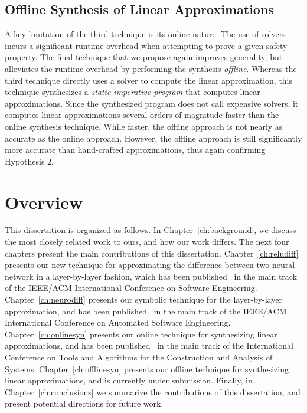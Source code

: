 \subsection{Offline Synthesis of Linear Approximations}
A key limitation of the third technique is its online nature. The use of solvers
incurs a significant runtime overhead when attempting to prove a given safety
property. The final technique that we propose again improves generality, but
alleviates the runtime overhead by performing the synthesis \textit{offline}.
Whereas the third technique directly uses a solver to compute the linear
approximation, this technique synthesizes a \textit{static imperative program}
that computes linear approximations. Since the synthesized program does not call
expensive solvers, it computes linear approximations several orders of magnitude
faster than the online synthesis technique. While faster, the offline approach is
not nearly as accurate as the online approach. However, the offline approach is
still significantly more accurate than hand-crafted approximations, thus again
confirming Hypothesis 2.

\section{Overview}
This dissertation is organized as follows. In Chapter~\ref{ch:background}, we
discuss the most closely related work to ours, and how our work differs. The next
four chapters present the main contributions of this dissertation.
Chapter~\ref{ch:reludiff} presents our new technique for approximating the
difference between two neural network in a layer-by-layer fashion, which has been
published~\cite{paulsen2020reludiff} in the main track of the IEEE/ACM
International Conference on Software Engineering. Chapter~\ref{ch:neurodiff}
presents our symbolic technique for the layer-by-layer approximation, and has been
published~\cite{paulsen2020neurodiff} in the main track of the IEEE/ACM
International Conference on Automated Software Engineering.
Chapter~\ref{ch:onlinesyn} presents our online technique for synthesizing linear
approximations, and has been published~\cite{paulsen2022linsyn} in the main track
of the International Conference on Tools and Algorithms for the Construction and
Analysis of Systems. Chapter~\ref{ch:offlinesyn} presents our offline technique
for synthesizing linear approximations, and is currently under submission.
Finally, in Chapter~\ref{ch:conclusions} we summarize the contributions of this
dissertation, and present potential directions for future work.
